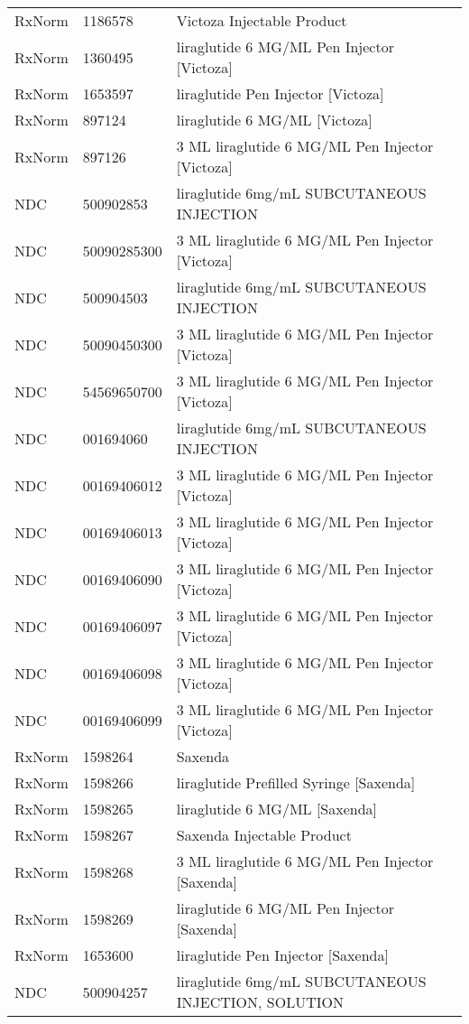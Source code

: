\begin{longtable}{p{}p{}p{}}
  RxNorm & 1186578 & Victoza Injectable Product \\ 
  RxNorm & 1360495 & liraglutide 6 MG/ML Pen Injector [Victoza] \\ 
  RxNorm & 1653597 & liraglutide Pen Injector [Victoza] \\ 
  RxNorm & 897124 & liraglutide 6 MG/ML [Victoza] \\ 
  RxNorm & 897126 & 3 ML liraglutide 6 MG/ML Pen Injector [Victoza] \\ 
  NDC & 500902853 & liraglutide 6mg/mL SUBCUTANEOUS INJECTION \\ 
  NDC & 50090285300 & 3 ML liraglutide 6 MG/ML Pen Injector [Victoza] \\ 
  NDC & 500904503 & liraglutide 6mg/mL SUBCUTANEOUS INJECTION \\ 
  NDC & 50090450300 & 3 ML liraglutide 6 MG/ML Pen Injector [Victoza] \\ 
  NDC & 54569650700 & 3 ML liraglutide 6 MG/ML Pen Injector [Victoza] \\ 
  NDC & 001694060 & liraglutide 6mg/mL SUBCUTANEOUS INJECTION \\ 
  NDC & 00169406012 & 3 ML liraglutide 6 MG/ML Pen Injector [Victoza] \\ 
  NDC & 00169406013 & 3 ML liraglutide 6 MG/ML Pen Injector [Victoza] \\ 
  NDC & 00169406090 & 3 ML liraglutide 6 MG/ML Pen Injector [Victoza] \\ 
  NDC & 00169406097 & 3 ML liraglutide 6 MG/ML Pen Injector [Victoza] \\ 
  NDC & 00169406098 & 3 ML liraglutide 6 MG/ML Pen Injector [Victoza] \\ 
  NDC & 00169406099 & 3 ML liraglutide 6 MG/ML Pen Injector [Victoza] \\ 
  RxNorm & 1598264 & Saxenda \\ 
  RxNorm & 1598266 & liraglutide Prefilled Syringe [Saxenda] \\ 
  RxNorm & 1598265 & liraglutide 6 MG/ML [Saxenda] \\ 
  RxNorm & 1598267 & Saxenda Injectable Product \\ 
  RxNorm & 1598268 & 3 ML liraglutide 6 MG/ML Pen Injector [Saxenda] \\ 
  RxNorm & 1598269 & liraglutide 6 MG/ML Pen Injector [Saxenda] \\ 
  RxNorm & 1653600 & liraglutide Pen Injector [Saxenda] \\ 
  NDC & 500904257 & liraglutide 6mg/mL SUBCUTANEOUS INJECTION, SOLUTION \\ 

\end{longtable}
